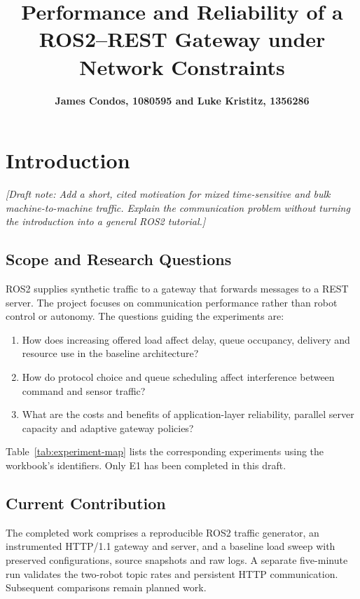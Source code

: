 \documentclass[10pt,a4paper,twocolumn,twoside]{tau-class/tau}
\title{Performance and Reliability of a ROS2--REST Gateway under Network Constraints}
\author{\textbf{James Condos, 1080595 and Luke Kristitz, 1356286}}
\newcommand{\draftnote}[1]{\par\noindent\textit{[Draft note: #1]}\par}
\begin{document}
\twocolumn[\maketitle]
\thispagestyle{firststyle}

\section{Introduction}
\label{sec:introduction}

\draftnote{Add a short, cited motivation for mixed time-sensitive and bulk
machine-to-machine traffic. Explain the communication problem without
turning the introduction into a general ROS2 tutorial.}

\subsection{Scope and Research Questions}
ROS2 supplies synthetic traffic to a gateway that forwards messages to a
REST server. The project focuses on communication performance rather than
robot control or autonomy. The questions guiding the experiments are:
\begin{enumerate}
    \item How does increasing offered load affect delay, queue occupancy,
    delivery and resource use in the baseline architecture?
    \item How do protocol choice and queue scheduling affect interference
    between command and sensor traffic?
    \item What are the costs and benefits of application-layer reliability,
    parallel server capacity and adaptive gateway policies?
\end{enumerate}
Table~\ref{tab:experiment-map} lists the corresponding experiments using
the workbook's identifiers. Only E1 has been completed in this draft.

\subsection{Current Contribution}
The completed work comprises a reproducible ROS2 traffic generator, an
instrumented HTTP/1.1 gateway and server, and a baseline load sweep with
preserved configurations, source snapshots and raw logs. A separate
five-minute run validates the two-robot topic rates and persistent HTTP
communication. Subsequent comparisons remain planned work.
\end{document}
